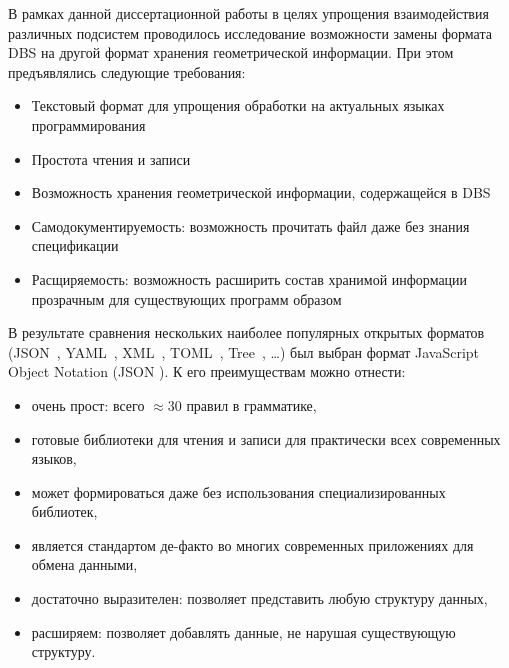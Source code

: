 В рамках данной диссертационной работы
в целях упрощения взаимодействия различных подсистем
проводилось исследование возможности замены
формата DBS
на другой формат хранения геометрической информации.
При этом предъявлялись следующие требования:
\begin{itemize}
  \item Текстовый формат для упрощения обработки на актуальных языках программирования
  \item Простота чтения и записи
  \item Возможность хранения геометрической информации, содержащейся в DBS
  \item Самодокументируемость:
  возможность прочитать файл даже без знания спецификации
  \item Расщиряемость:
  возможность расширить состав хранимой информации прозрачным для существующих программ образом
\end{itemize}

В результате сравнения нескольких
наиболее популярных открытых форматов
(JSON~\cite{bi:JSON},
YAML~\cite{bi:YAML},
XML~\cite{bi:XML},
TOML~\cite{bi:XML},
Tree~\cite{bi:tree.d},
\dots)
был выбран формат
JavaScript Object Notation
(JSON
\cite{bi:JSON}).
К его преимуществам можно отнести:
\begin{itemize}
  \item очень прост:
  всего $\approx 30$ правил в грамматике,
  \item готовые библиотеки для чтения и записи
  для практически всех современных языков,
  \item может формироваться даже
  без использования специализированных библиотек,
  \item является стандартом де-факто во многих
  современных приложениях для обмена данными,
  \item достаточно выразителен:
  позволяет представить любую структуру данных,
  \item расширяем:
  позволяет добавлять данные,
  не нарушая существующую структуру.
\end{itemize}

